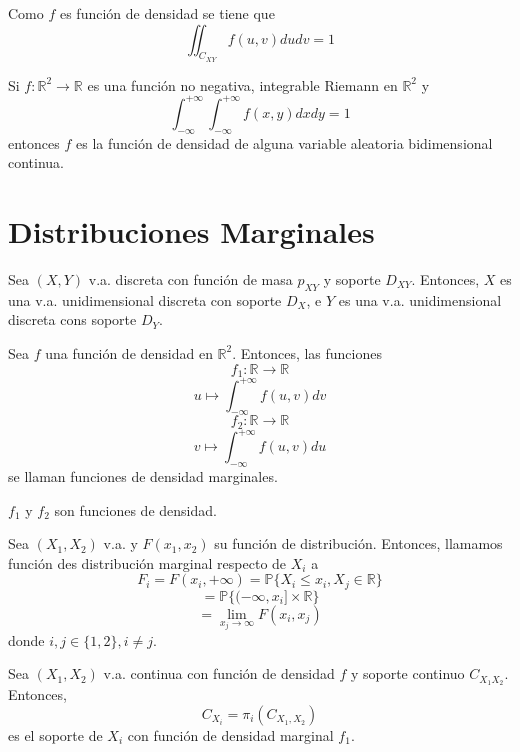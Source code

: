 \begin{obs}
  Como $f$ es función de densidad se tiene que
  \[ 
    \iint_{C_{XY}}^{} f(u,v) dudv = 1 
  \] 
\end{obs}

\begin{theo}
  Si $f : \mathbb{R}^{2} \to \mathbb{R}$ es una función no negativa, integrable Riemann en $\mathbb{R}^{2}$ y
  \[ 
    \int_{-\infty}^{+ \infty} \int_{-\infty}^{+\infty} f(x,y) dx dy = 1 
  \] 
  entonces $f$ es la función de densidad de alguna variable aleatoria bidimensional continua.
\end{theo}

\section{Distribuciones Marginales}

\begin{theo}
  Sea $(X,Y)$ v.a. discreta con función de masa $p_{XY}$ y soporte $D_{XY}$. Entonces, $X$ es una v.a. unidimensional discreta con soporte $D_{X}$, e $Y$ es una v.a. unidimensional discreta cons soporte $D_{Y}$.
\end{theo}

\begin{defn}
  Sea $f$ una función de densidad en $\mathbb{R}^{2}$. Entonces, las funciones
  \[ 
    f_{1} : \mathbb{R} \to \mathbb{R} 
  \] 
  \[ 
    u \mapsto \int_{-\infty}^{+\infty} f(u,v) dv 
  \] 
  \[ 
    f_{2} : \mathbb{R} \to \mathbb{R} 
  \] 
  \[ 
    v \mapsto \int_{-\infty}^{+\infty} f(u,v) du 
  \] 
  se llaman funciones de densidad marginales.
\end{defn}

\begin{obs}
  $f_{1}$ y $f_{2}$ son funciones de densidad.
\end{obs}

\begin{defn}
  Sea $(X_{1},X_{2})$ v.a. y $F(x_{1},x_{2})$ su función de distribución. Entonces, llamamos función des distribución marginal respecto de $X_{i}$ a
  \[ 
    F_{i} = F(x_{i}, + \infty) = \mathbb{P} \{ X_{i} \leq x_{i}, X_{j} \in \mathbb{R} \}
  \] 
  \[ 
    = \mathbb{P} \{ (- \infty, x_{i}] \times \mathbb{R} \} 
  \] 
  \[ 
    = \lim_{x_{j} \to \infty} F(x_{i}, x_{j}) 
  \] 
  donde $i, j \in \{ 1, 2 \}, i \neq j$.
\end{defn}

\begin{theo}
  Sea $(X_{1}, X_{2})$ v.a. continua con función de densidad $f$ y soporte continuo $C_{X_{1} X_{2}}$. Entonces,
  \[ 
    C_{X_{i}} = \pi_{i}(C_{X_{1}, X_{2}})
  \] 
  es el soporte de $X_{i}$ con función de densidad marginal $f_{1}$.
\end{theo}

